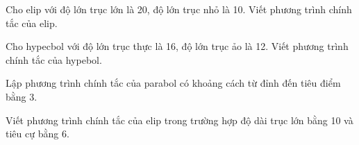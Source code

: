 \begin{vd}
	Cho elip với độ lớn trục lớn là 20, độ lớn trục nhỏ là 10. Viết phương trình chính tắc của elip.
\end{vd}

\begin{vd}
	Cho hypecbol với độ lớn trục thực là 16, độ lớn trục ảo là 12. Viết phương trình chính tắc của hypebol.
\end{vd}

\begin{vd}
	Lập phương trình chính tắc của parabol có khoảng cách từ đỉnh đến tiêu điểm bằng 3. 
\end{vd}

\begin{bt}
	Viết phương trình chính tắc của elip trong trường hợp độ dài trục lớn bằng 10 và tiêu cự bằng 6.

\end{bt}

